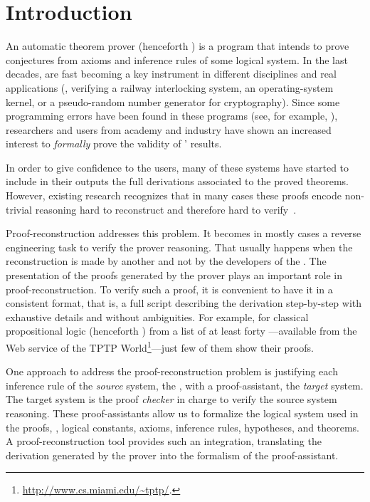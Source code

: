 \documentclass[../main.tex]{subfiles}
\begin{document}

\section{Introduction}
\label{sec:introduction}

An automatic theorem prover (henceforth \ATP) is a program that
intends to prove conjectures from axioms and inference rules of some
logical system. In the last decades, \ATPs are fast becoming a key
instrument in different disciplines and real applications (\eg,
verifying a railway interlocking system, an operating-system kernel,
or a pseudo-random number generator for cryptography). Since some
programming errors have been found in these programs (see, for
example, \cite{Keller2013,Bohme2011,Fleury2014}), researchers and
users from academy and industry have shown an increased interest to
\emph{formally} prove the validity of \ATPs' results.

In order to give confidence to the \ATP users, many of these systems
have started to include in their outputs the full derivations
associated to the proved theorems. However, existing research
recognizes that in many cases these proofs encode non-trivial
reasoning hard to reconstruct and therefore hard to
verify~\cite{paulson2007source,Keller2013}.

Proof-reconstruction addresses this problem. It becomes in mostly
cases a reverse engineering task to verify the prover reasoning. That
usually happens when the reconstruction is made by another and not by
the developers of the \ATP. The presentation of the proofs generated
by the prover plays an important role in proof-reconstruction. To
verify such a proof, it is convenient to have it in a consistent
format, that is, a full script describing the derivation step-by-step
with  exhaustive details and without ambiguities. For example, for
classical propositional logic (henceforth \CPL) from a list of at
least forty \ATPs---available from the Web service
 of the TPTP World\footnote{\url{http://www.cs.miami.edu/~tptp/}.}---just few of
them show their proofs.

One approach to address the proof-reconstruction problem is
justifying each inference rule of the \emph{source} system, the \ATP,
with a proof-assistant, the \emph{target} system. The target system
is the proof \emph{checker} in charge to verify the source system
reasoning.
These proof-assistants allow us to formalize the logical system used
in the proofs, \ie, logical constants, axioms, inference rules,
hypotheses, and theorems. A proof-reconstruction tool provides such
an integration, translating the derivation generated by the prover
into the formalism of the proof-assistant.
\end{document}
